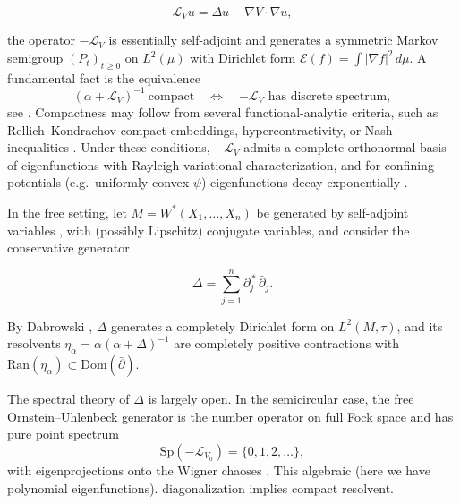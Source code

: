 \documentclass[10pt,a4paper,reqno]{amsart}
\newcommand{\Dom}{\mathrm{Dom}}
\begin{document}
\begin{equation}\label{langevin}
   \mathcal L_{V}u=\Delta u-\nabla V\cdot\nabla u, 
\end{equation}



the operator $-\mathcal L_{V}$ is essentially self-adjoint and generates a symmetric
Markov semigroup $(P_t)_{t\ge0}$ on $L^2(\mu)$ with Dirichlet form
$\mathcal{E}(f)=\int |\nabla f|^2\,d\mu$.  A fundamental fact is the
equivalence
\begin{equation}\label{eq:comp-resolvent-discrete}
(\alpha+\mathcal L_{V})^{-1}\ \text{compact}
\quad\Longleftrightarrow\quad
\text{$-\mathcal L_{V}$ has discrete spectrum},
\end{equation}
see \cite{Davies,ReedSimonIV}.  Compactness may follow from several
functional-analytic criteria, such as Rellich--Kondrachov compact
embeddings, hypercontractivity, or Nash inequalities
\cite{Ledoux,Davies}.  Under these conditions, $-\mathcal L_{V}$ admits a complete
orthonormal basis of eigenfunctions with Rayleigh variational
characterization, and for confining potentials
(e.g.\ uniformly convex $\psi$) eigenfunctions decay exponentially
\cite{Simon,ReedSimonIV}.

\medskip

In the free setting, let $M=W^\ast(X_1,\ldots,X_n)$ be generated by
self-adjoint variables , with (possibly Lipschitz) conjugate variables, and consider the conservative generator


\[
\Delta=\sum_{j=1}^n \partial_j^{\,*}\,\bar\partial_j.
\]


By Dabrowski \cite{Dab10,Dab14}, $\Delta$ generates a completely Dirichlet
form on $L^2(M,\tau)$, and its resolvents
$\eta_\alpha=\alpha(\alpha+\Delta)^{-1}$ are completely positive
contractions with $\mathrm{Ran}(\eta_\alpha)\subset\Dom(\bar\partial)$.

The spectral theory of $\Delta$ is largely open.  In the semicircular
case, the free Ornstein--Uhlenbeck generator is the number operator on
full Fock space and has pure point spectrum
\begin{equation}\label{eq:free-OU-spectrum}
\mathrm{Sp}(-\mathcal{L}_{V_0})=\{0,1,2,\ldots\},
\end{equation}
with eigenprojections onto the Wigner chaoses \cite{BS,Di2}.  This
algebraic (here we have polynomial eigenfunctions).
diagonalization implies compact resolvent.
\end{document}
